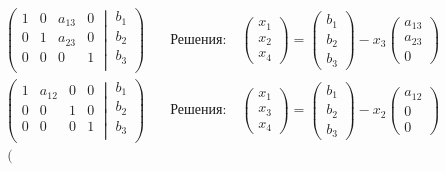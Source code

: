 \begin{align*}
\left(\left.
\begin{matrix}
1& 0&a_{13}& 0\\
0& 1&a_{23}& 0\\
0& 0&0&1\\
\end{matrix}
\:\right|\:
\begin{matrix}
b_1\\
b_2\\
b_3\\
\end{matrix}
\right)&\quad
\text{Решения:}\quad
\begin{pmatrix}
x_1\\
x_2\\
x_4
\end{pmatrix}
=
\begin{pmatrix}
b_1\\
b_2\\
b_3
\end{pmatrix}
-
x_3
\begin{pmatrix}
a_{13}\\
a_{23}\\
0
\end{pmatrix}\\
\left(\left.
\begin{matrix}
1& a_{12}&0& 0\\
0& 0&1& 0\\
0& 0&0&1\\
\end{matrix}
\:\right|\:
\begin{matrix}
b_1\\
b_2\\
b_3\\
\end{matrix}
\right)&\quad
\text{Решения:}\quad
\begin{pmatrix}
x_1\\
x_3\\
x_4
\end{pmatrix}
=
\begin{pmatrix}
b_1\\
b_2\\
b_3
\end{pmatrix}
-
x_2
\begin{pmatrix}
a_{12}\\
0\\
0
\end{pmatrix}\\
\left(\left.
\begin{matrix}

\end{matrix}
\end{align*}
